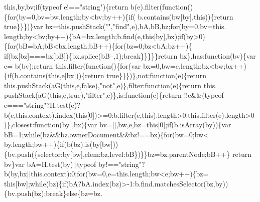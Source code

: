 \begin{DoxyCode}
{{      this},by,bv;\textcolor{keywordflow}{if}(typeof e!==\textcolor{stringliteral}{"string"})\{\textcolor{keywordflow}{return} b(e).filter(\textcolor{keyword}{function}()\{\textcolor{keywordflow}{for}(by=0,bv=bw.length;by<bv;by++)\{\textcolor{keywordflow}{if}(
      b.contains(bw[by],\textcolor{keyword}{this}))\{\textcolor{keywordflow}{return} \textcolor{keyword}{true}\}\}\})\}var bx=this.pushStack(\textcolor{stringliteral}{""},\textcolor{stringliteral}{"find"},e),bA,bB,bz;\textcolor{keywordflow}{for}(by=0,bv=this.
      length;by<bv;by++)\{bA=bx.length;b.find(e,\textcolor{keyword}{this}[by],bx);\textcolor{keywordflow}{if}(by>0)\{\textcolor{keywordflow}{for}(bB=bA;bB<bx.length;bB++)\{\textcolor{keywordflow}{for}(bz=0;bz<bA;bz++)\{\textcolor{keywordflow}{
      if}(bx[bz]===bx[bB])\{bx.splice(bB--,1);\textcolor{keywordflow}{break}\}\}\}\}\}\textcolor{keywordflow}{return} bx\},has:\textcolor{keyword}{function}(bv)\{var e=
      b(bv);\textcolor{keywordflow}{return} this.filter(\textcolor{keyword}{function}()\{\textcolor{keywordflow}{for}(var bx=0,bw=e.length;bx<bw;bx++)\{\textcolor{keywordflow}{if}(b.contains(\textcolor{keyword}{this},e[bx]))\{\textcolor{keywordflow}{return} \textcolor{keyword}{
      true}\}\}\})\},not:\textcolor{keyword}{function}(e)\{\textcolor{keywordflow}{return} this.pushStack(aG(\textcolor{keyword}{this},e,\textcolor{keyword}{false}),\textcolor{stringliteral}{"not"},e)\},filter:\textcolor{keyword}{function}(e)\{\textcolor{keywordflow}{return} this.
      pushStack(aG(\textcolor{keyword}{this},e,\textcolor{keyword}{true}),\textcolor{stringliteral}{"filter"},e)\},is:\textcolor{keyword}{function}(e)\{\textcolor{keywordflow}{return} !!e&&(typeof e===\textcolor{stringliteral}{"string"}?H.test(e)?
      b(e,this.context).index(\textcolor{keyword}{this}[0])>=0:b.filter(e,\textcolor{keyword}{this}).length>0:this.filter(e).length>0)\},closest:\textcolor{keyword}{function}(by
      ,bx)\{var bv=[],bw,e,bz=\textcolor{keyword}{this}[0];\textcolor{keywordflow}{if}(b.isArray(by))\{var bB=1;\textcolor{keywordflow}{while}(bz&&bz.ownerDocument&&bz!==bx)\{\textcolor{keywordflow}{for}(bw=0;bw<
      by.length;bw++)\{\textcolor{keywordflow}{if}(b(bz).is(by[bw]))\{bv.push(\{selector:by[bw],elem:bz,level:bB\})\}\}bz=bz.parentNode;bB++\}\textcolor{keywordflow}{
      return} bv\}var bA=H.test(by)||typeof by!==\textcolor{stringliteral}{"string"}?b(by,bx||this.context):0;\textcolor{keywordflow}{for}(bw=0,e=this.length;bw<e;bw++)\{bz=\textcolor{keyword}{
      this}[bw];\textcolor{keywordflow}{while}(bz)\{\textcolor{keywordflow}{if}(bA?bA.index(bz)>-1:b.find.matchesSelector(bz,by))\{bv.push(bz);\textcolor{keywordflow}{break}\}\textcolor{keywordflow}{else}\{bz=bz.
}
\end{DoxyCode}
